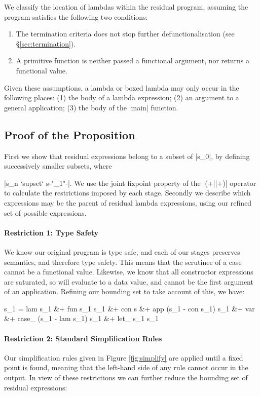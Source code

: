 We classify the location of lambdas within the residual program, assuming the program satisfies the following two conditions:

\begin{enumerate}
\item The termination criteria does not stop further defunctionalisation (see \S\ref{sec:termination}).
\item A primitive function is neither passed a functional argument, nor returns a functional value.
\end{enumerate}

Given these assumptions, a lambda or boxed lambda may only occur in the following places: (1) the body of a lambda expression; (2) an argument to a general application; (3) the body of the |main| function.

\subsection{Proof of the Proposition}

First we show that residual expressions belong to a subset of |s_0|, by defining successively smaller subsets, where \ignore|s_n `supset` s{-"_{\text{\tiny{+}}1}"-}|. We use the joint fixpoint property of the |(+||+)| operator to calculate the restrictions imposed by each stage. Secondly we describe which expressions may be the parent of residual lambda expressions, using our refined set of possible expressions.

\paragraph{Restriction 1: Type Safety}
We know our original program is type safe, and each of our stages preserves semantics, and therefore type safety. This means that the scrutinee of a case cannot be a functional value. Likewise, we know that all constructor expressions are saturated, so will evaluate to a data value, and cannot be the first argument of an application. Refining our bounding set to take account of this, we have:

\ignore\begin{code}
s_1  =  lam s_1 &+ fun s_1 s_1 &+ con s &+ app (s_1 - con s_1) s_1 &+ var &+
        case_ (s_1 - lam s_1) s_1 &+ let_ s_1 s_1
\end{code}

\paragraph{Restriction 2: Standard Simplification Rules}
Our simplification rules given in Figure \ref{fig:simplify} are applied until a fixed point is found, meaning that the left-hand side of any rule cannot occur in the output. In view of these restrictions we can further reduce the bounding set of residual expressions:

